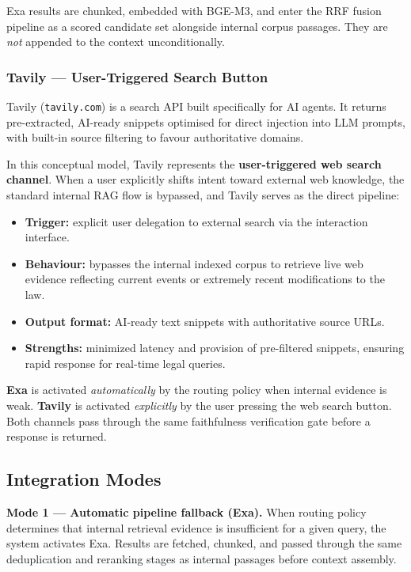\documentclass[12pt, a4paper]{article}
\begin{document}
Exa results are chunked, embedded with BGE-M3, and enter the RRF fusion
pipeline as a scored candidate set alongside internal corpus passages.
They are \emph{not} appended to the context unconditionally.

\subsubsection{Tavily --- User-Triggered Search Button}

Tavily (\texttt{tavily.com}) is a search API built specifically for AI agents.
It returns pre-extracted, AI-ready snippets optimised for direct injection into
LLM prompts, with built-in source filtering to favour authoritative domains.

In this conceptual model, Tavily represents the \textbf{user-triggered web search
channel}. When a user explicitly shifts intent toward external web knowledge,
the standard internal RAG flow is bypassed, and Tavily serves as the direct pipeline:

\begin{itemize}[leftmargin=1.8em, itemsep=0.2em]
  \item \textbf{Trigger:} explicit user delegation to external search via the interaction interface.
  \item \textbf{Behaviour:} bypasses the internal indexed corpus to retrieve live web
        evidence reflecting current events or extremely recent modifications to the law.
  \item \textbf{Output format:} AI-ready text snippets with authoritative source URLs.
  \item \textbf{Strengths:} minimized latency and provision of pre-filtered snippets, ensuring
        rapid response for real-time legal queries.
\end{itemize}

\begin{webbox}
\textbf{Exa} is activated \emph{automatically} by the routing policy when
internal evidence is weak. \textbf{Tavily} is activated \emph{explicitly}
by the user pressing the web search button. Both channels pass through the
same faithfulness verification gate before a response is returned.
\end{webbox}

\subsection{Integration Modes}

\textbf{Mode 1 --- Automatic pipeline fallback (Exa).}
When routing policy determines that internal retrieval evidence is insufficient
for a given query, the system activates Exa. Results are fetched, chunked, and
passed through the same deduplication and reranking stages as internal passages
before context assembly.
\end{document}
